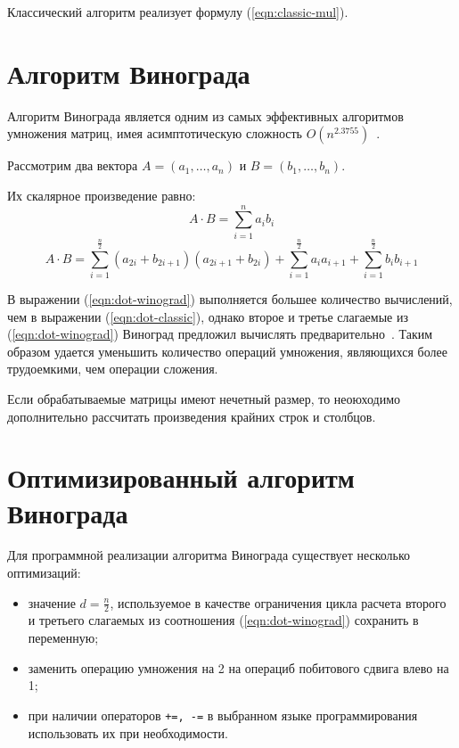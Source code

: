 Классический алгоритм реализует формулу (\ref{eqn:classic-mul}).

\section{Алгоритм Винограда}

Алгоритм Винограда является одним из самых эффективных алгоритмов умножения матриц, имея асимптотическую сложность $O(n^{2.3755})$~\cite{winograd-haskell}.

Рассмотрим два вектора $A = (a_1, \ldots, a_n)$ и $B = (b_1, \ldots, b_n)$.

Их скалярное произведение равно:
\begin{equation}
    \label{eqn:dot-classic}
    A \cdot B = \sum_{i=1}^{n}a_ib_i
\end{equation}
\begin{equation}
    \label{eqn:dot-winograd}
    A \cdot B = \sum_{i=1}^{\frac{n}{2}}(a_{2i} + b_{2i+1})(a_{2i+1} + b_{2i}) + \sum_{i=1}^{\frac{n}{2}}a_ia_{i+1} + \sum_{i=1}^{\frac{n}{2}}b_ib_{i+1}
\end{equation}

В выражении (\ref{eqn:dot-winograd}) выполняется большее количество вычислений, чем в выражении (\ref{eqn:dot-classic}), однако второе и третье слагаемые из (\ref{eqn:dot-winograd}) Виноград предложил вычислять предварительно~\cite{winograd-haskell}.
Таким образом удается уменьшить количество операций умножения, являющихся более трудоемкими, чем операции сложения.

Если обрабатываемые матрицы имеют нечетный размер, то неоюходимо дополнительно рассчитать произведения крайних строк и столбцов.

\section{Оптимизированный алгоритм Винограда}

Для программной реализации алгоритма Винограда существует несколько оптимизаций:
\begin{itemize}
    \item значение $d = \frac{n}{2}$, используемое в качестве ограничения цикла расчета второго и третьего слагаемых из соотношения (\ref{eqn:dot-winograd}) сохранить в переменную;
    \item заменить операцию умножения на 2 на операциб побитового сдвига влево на 1;
    \item при наличии операторов \texttt{+=, -=} в выбранном языке программирования использовать их при необходимости.
\end{itemize}

